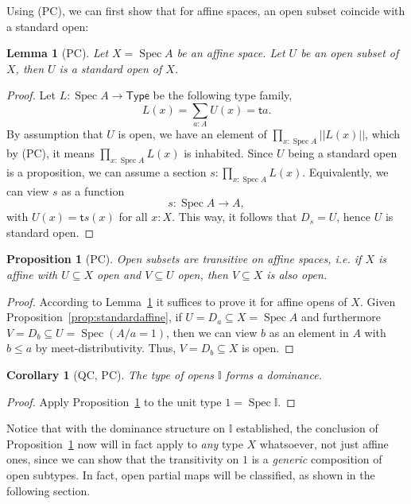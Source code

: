 \documentclass[12pt]{amsart}
\newtheorem{lemma}[theorem]{Lemma}
\newtheorem{corollary}[theorem]{Corollary}
\newtheorem{proposition}[theorem]{Proposition}
\theoremstyle{definition}
\newcommand{\mbb}[1]{\mathbb{#1}}
\newcommand{\I}{\mbb I}
\newcommand{\ms}[1]{\mathsf{#1}}
\newcommand{\pss}[1]{||#1||} %
\newcommand{\tp}{\ms{Type}}
\newcommand{\spec}{\operatorname{Spec}}
\begin{document}
Using (PC), we can first show that for affine spaces, an open subset coincide with a standard open:

\begin{lemma}[PC]\label{lem:openareaffineopen}
  Let $X = \spec A$ be an affine space. Let $U$ be an open subset of $X$, then $U$ is a standard open of $X$.
\end{lemma}
\begin{proof}
  Let $L : \spec A \to \tp$ be the following type family,
  \[ L(x) = \sum_{a : A} U(x) = \ms ta. \]
  By assumption that $U$ is open, we have an element of $\prod_{x:\spec A}\pss{L(x)}$, which by (PC), it means $\prod_{x:\spec A}L(x)$ is inhabited. Since $U$ being a standard open is a proposition, we can assume a section $s : \prod_{x:\spec A}L(x)$. Equivalently, we can view $s$ as a function
  \[ s : \spec A \to A, \]
  with $U(x) = \ms ts(x)$ for all $x : X$. This way, it follows that $D_s = U$, hence $U$ is standard open.
\end{proof}

\begin{proposition}[PC]\label{prop:transopen}
  Open subsets are transitive on affine spaces, i.e. if $X$ is affine with $U \subseteq X$ open and $V \subseteq U$ open, then $V \subseteq X$ is also open.
\end{proposition}
\begin{proof}
  According to Lemma~\ref{lem:openareaffineopen} it suffices to prove it for affine opens of $X$. Given Proposition~\ref{prop:standardaffine}, if $U = D_a \subseteq X = \spec A$ and furthermore $V = D_b \subseteq U = \spec(A/a=1)$, then we can view $b$ as an element in $A$ with $b \le a$ by meet-distributivity. Thus, $V = D_b \subseteq X$ is open.
\end{proof}

\begin{corollary}[QC, PC]\label{cor:Idominance}
  The type of opens $\I$ forms a \emph{dominance}.
\end{corollary}
\begin{proof}
  Apply Proposition~\ref{prop:transopen} to the unit type $1 = \spec\I$.
\end{proof}

Notice that with the dominance structure on $\I$ established, the conclusion of Proposition~\ref{prop:transopen} now will in fact apply to \emph{any} type $X$ whatsoever, not just affine ones, since we can show that the transitivity on $1$ is a \emph{generic} composition of open subtypes. In fact, open partial maps will be classified, as shown in the following section.
\end{document}
